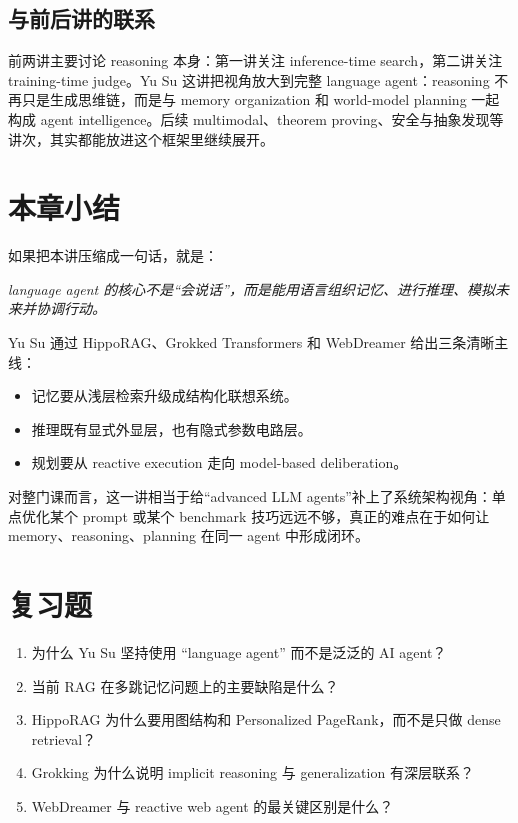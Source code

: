 \documentclass[a4paper]{article}
\begin{document}
\subsection{与前后讲的联系}

前两讲主要讨论 reasoning 本身：第一讲关注 inference-time search，第二讲关注 training-time judge。Yu Su 这讲把视角放大到完整 language agent：reasoning 不再只是生成思维链，而是与 memory organization 和 world-model planning 一起构成 agent intelligence。后续 multimodal、theorem proving、安全与抽象发现等讲次，其实都能放进这个框架里继续展开。

\section{本章小结}

如果把本讲压缩成一句话，就是：
\begin{center}
\emph{language agent 的核心不是“会说话”，而是能用语言组织记忆、进行推理、模拟未来并协调行动。}
\end{center}

Yu Su 通过 HippoRAG、Grokked Transformers 和 WebDreamer 给出三条清晰主线：
\begin{itemize}
\item 记忆要从浅层检索升级成结构化联想系统。
\item 推理既有显式外显层，也有隐式参数电路层。
\item 规划要从 reactive execution 走向 model-based deliberation。
\end{itemize}

对整门课而言，这一讲相当于给“advanced LLM agents”补上了系统架构视角：单点优化某个 prompt 或某个 benchmark 技巧远远不够，真正的难点在于如何让 memory、reasoning、planning 在同一 agent 中形成闭环。

\section{复习题}

\begin{enumerate}
\item 为什么 Yu Su 坚持使用 “language agent” 而不是泛泛的 AI agent？
\item 当前 RAG 在多跳记忆问题上的主要缺陷是什么？
\item HippoRAG 为什么要用图结构和 Personalized PageRank，而不是只做 dense retrieval？
\item Grokking 为什么说明 implicit reasoning 与 generalization 有深层联系？
\item WebDreamer 与 reactive web agent 的最关键区别是什么？
\end{enumerate}
\end{document}
